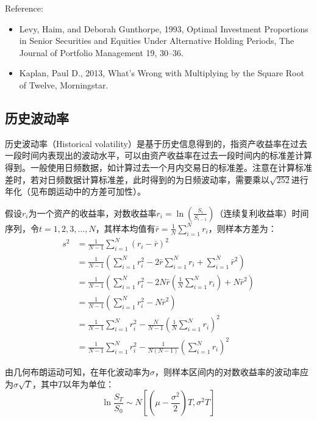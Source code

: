 \documentclass[11pt]{article}
\begin{document}
Reference:
\begin{itemize}
    \item Levy, Haim, and Deborah Gunthorpe, 1993, Optimal Investment Proportions in Senior Securities and Equities Under Alternative Holding Periods, The Journal of Portfolio Management 19, 30–36.
    \item Kaplan, Paul  D., 2013, What’s Wrong with Multiplying by the Square Root of Twelve, Morningstar.
\end{itemize}

\subsection{历史波动率}

历史波动率（Historical volatility）是基于历史信息得到的，指资产收益率在过去一段时间内表现出的波动水平，可以由资产收益率在过去一段时间内的标准差计算得到。一般使用日频数据，如计算过去一个月内交易日的标准差。注意在计算标准差时，若对日频数据计算标准差，此时得到的为日频波动率，需要乘以$\sqrt{252}$进行年化（见布朗运动中的方差可加性）。

假设$r_i$为一个资产的收益率，对数收益率$r_i = \ln \left( \frac{S_i}{S_{i-1}} \right)$（连续复利收益率）时间序列，令$t=1,2,3,\dots,N$，其样本均值有$\bar{r} = \frac{1}{N} \sum_{i=1}^{N}r_i$，则样本方差为：
\begin{align*}
    s^2 &= \frac{1}{N-1} \sum^N_{i=1} (r_i - \bar{r})^2 \\
    &= \frac{1}{N-1} \left( \sum^N_{i=1} r_i^2 - 2\bar{r} \sum^N_{i=1} r_i + \sum^N_{i=1} \bar{r}^2 \right) \\
    &= \frac{1}{N-1} \left( \sum^N_{i=1} r_i^2 - 2N\bar{r}\left(\frac{1}{N} \sum^N_{i=1} r_i \right) + N \bar{r}^2 \right) \\
    &= \frac{1}{N-1} \left( \sum^N_{i=1} r_i^2 - N \bar{r}^2 \right) \\
    &= \frac{1}{N-1} \sum^N_{i=1} r_i^2 - \frac{N}{N-1} \left( \frac{1}{N}  \sum^N_{i=1} r_i \right)^2 \\
    &= \frac{1}{N-1} \sum^N_{i=1} r_i^2 - \frac{1}{N(N-1)} \left( \sum^N_{i=1} r_i \right)^2
\end{align*}

由几何布朗运动可知，在年化波动率为$\sigma$，则样本区间内的对数收益率的波动率应为$\sigma \sqrt{T}$，其中$T$以年为单位：
\begin{equation*}
    \ln \frac{S_T}{S_0} \sim N\left[ \left(\mu-\frac{\sigma^2}{2}\right)T ,\sigma^2 T \right]
\end{equation*}
\end{document}
